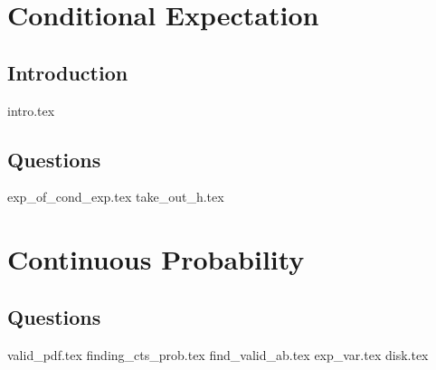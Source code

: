\documentclass{exam}
\begin{document}
\section{Conditional Expectation}
\subsection{Introduction}
{intro.tex}
\subsection{Questions}
\begin{questions}
{exp_of_cond_exp.tex}
{take_out_h.tex}
\end{questions}

\section{Continuous Probability}
\subsection{Questions}
\begin{questions}
{valid_pdf.tex}
{finding_cts_prob.tex}
{find_valid_ab.tex}
{exp_var.tex}
{disk.tex}
\end{questions}
\end{document}
